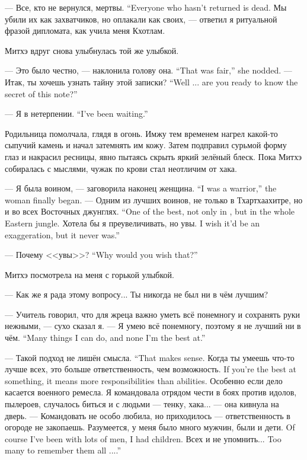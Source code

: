 {--- Все, кто не вернулся, мертвы.}
{``Everyone who hasn't returned is dead. }
Мы убили их как захватчиков, но оплакали как своих, --- ответил я ритуальной фразой дипломата, как учила меня Кхотлам.

Митхэ вдруг снова улыбнулась той же улыбкой.

{--- Это было честно, --- наклонила голову она.}
{``That was fair,'' she nodded.}
{--- Итак, ты хочешь узнать тайну этой записки?}
{``Well ... are you ready to know the secret of this note?''}

{--- Я в нетерпении.}
{``I've been waiting.''}

Родильница помолчала, глядя в огонь.
Имжу тем временем нагрел какой-то сыпучий камень и начал затемнять им кожу.
Затем подправил сурьмой форму глаз и накрасил ресницы, явно пытаясь скрыть яркий зелёный блеск.
Пока Митхэ собиралась с мыслями, чужак по крови стал неотличим от хака.

{--- Я была воином, --- заговорила наконец женщина.}
{``I was a warrior,'' the woman finally began.}
{--- Одним из лучших воинов, не только в Тхартхаахитре, но и во всех Восточных джунглях.}
{``One of the best, not only in \Tchartchaahitr, but in the whole Eastern jungle.}
{Хотела бы я преувеличивать, но увы.}
{I wish it'd be an exaggeration, but it never was.''}

{--- Почему <<увы>>?}
{``Why would you wish that?''}

Митхэ посмотрела на меня с горькой улыбкой.

--- Как же я рада этому вопросу...
Ты никогда не был ни в чём лучшим?

--- Учитель говорил, что для жреца важно уметь всё понемногу и сохранять руки нежными, --- сухо сказал я.
{--- Я умею всё понемногу, поэтому я не лучший ни в чём.}
{``Many things I can do, and none I'm the best at.''}

{--- Такой подход не лишён смысла.}
{``That makes sense.}
{Когда ты умеешь что-то лучше всех, это больше ответственность, чем возможность.}
{If you're the best at something, it means more responsibilities than abilities.}
Особенно если дело касается военного ремесла.
Я командовала отрядом чести в боях против идолов, пылероев, случалось биться и с людьми --- тенку, хака... --- она кивнула на дверь.
--- Командовать не особо любила, но приходилось --- ответственность в огороде не закопаешь.
{Разумеется, у меня было много мужчин, были и дети.}
{Of course I've been with lots of men, I had children.}
{Всех и не упомнить...}
{Too many to remember them all ....''}

